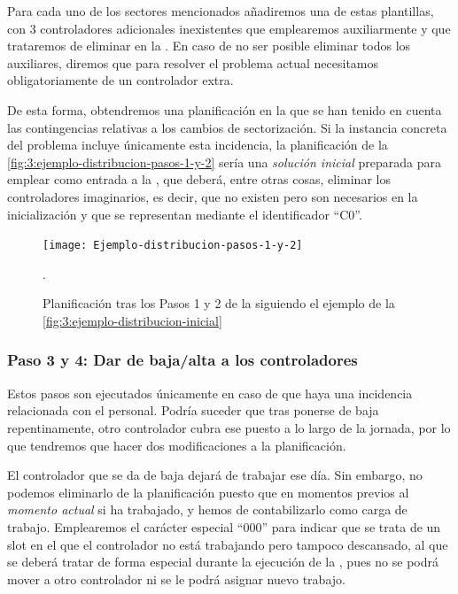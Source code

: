 Para cada uno de los sectores mencionados añadiremos una de estas plantillas, con 3 controladores adicionales inexistentes que emplearemos auxiliarmente y que trataremos de eliminar en la \fasedos{}. En caso de no ser posible eliminar todos los auxiliares, diremos que para resolver el problema actual necesitamos obligatoriamente de un controlador extra.

De esta forma, obtendremos una planificación en la que se han tenido en cuenta las contingencias relativas a los cambios de sectorización. Si la instancia concreta del problema incluye únicamente esta incidencia, la planificación de la \autoref{fig:3:ejemplo-distribucion-pasos-1-y-2} sería una \textit{solución inicial} preparada para emplear como entrada a la \fasedos{}, que deberá, entre otras cosas, eliminar los controladores imaginarios, es decir, que no existen pero son necesarios en la inicialización y que se representan mediante el identificador ``C0''.

\begin{figure}[htbp]
	\centering
	\texttt{[image: Ejemplo-distribucion-pasos-1-y-2]}
	\caption[Planificación tras los Pasos 1 y 2 de la Fase 1]{Planificación tras los Pasos 1 y 2 de la \faseuno{} siguiendo el ejemplo de la \autoref{fig:3:ejemplo-distribucion-inicial}}. 
	\label{fig:3:ejemplo-distribucion-pasos-1-y-2}
\end{figure}

\subsubsection{Paso 3 y 4: Dar de baja/alta a los controladores}
\label{sec:baja-alta-controladores}

Estos pasos son ejecutados únicamente en caso de que haya una incidencia relacionada con el personal. Podría suceder que tras ponerse de baja repentinamente, otro controlador cubra ese puesto a lo largo de la jornada, por lo que tendremos que hacer dos modificaciones a la planificación.

El controlador que se da de baja dejará de trabajar ese día. Sin embargo, no podemos eliminarlo de la planificación puesto que en momentos previos al \textit{momento actual} si ha trabajado, y hemos de contabilizarlo como carga de trabajo. Emplearemos el carácter especial ``000'' para indicar que se trata de un slot en el que el controlador no está trabajando pero tampoco descansado, al que se deberá tratar de forma especial durante la ejecución de la \fasedos{}, pues no se podrá mover a otro controlador ni se le podrá asignar nuevo trabajo. 

